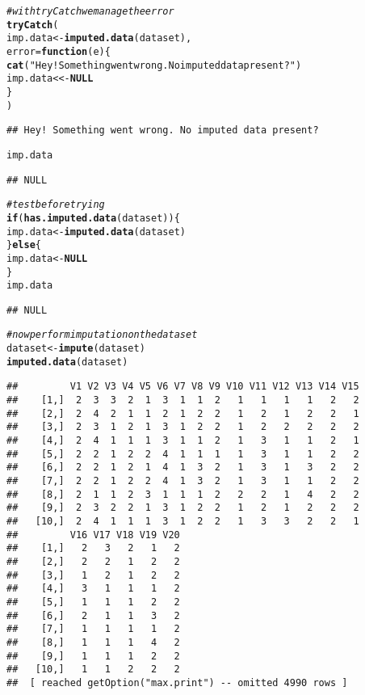 \documentclass{article}\usepackage[]{graphicx}\usepackage[]{color}
\makeatletter
\newcommand{\hlstr}[1]{\textcolor[rgb]{0.192,0.494,0.8}{#1}}%
\newcommand{\hlcom}[1]{\textcolor[rgb]{0.678,0.584,0.686}{\textit{#1}}}%
\newcommand{\hlstd}[1]{\textcolor[rgb]{0.345,0.345,0.345}{#1}}%
\newcommand{\hlkwa}[1]{\textcolor[rgb]{0.161,0.373,0.58}{\textbf{#1}}}%
\newcommand{\hlkwb}[1]{\textcolor[rgb]{0.69,0.353,0.396}{#1}}%
\newcommand{\hlkwc}[1]{\textcolor[rgb]{0.333,0.667,0.333}{#1}}%
\newcommand{\hlkwd}[1]{\textcolor[rgb]{0.737,0.353,0.396}{\textbf{#1}}}%
\newenvironment{kframe}{%
 \def\at@end@of@kframe{}%
 \ifinner\ifhmode%
  \def\at@end@of@kframe{\end{minipage}}%
  \begin{minipage}{\columnwidth}%
 \fi\fi%
 \def\FrameCommand##1{\hskip\@totalleftmargin \hskip-\fboxsep
 \colorbox{shadecolor}{##1}\hskip-\fboxsep
     \hskip-\linewidth \hskip-\@totalleftmargin \hskip\columnwidth}%
 \MakeFramed {\advance\hsize-\width
   \@totalleftmargin\z@ \linewidth\hsize
   \@setminipage}}%
 {\par\unskip\endMakeFramed%
 \at@end@of@kframe}
\newenvironment{knitrout}{}{} %
\makeatother
\begin{document}
\begin{knitrout}
\begin{kframe}
{\ttfamily\noindent\bfseries\color{errorcolor}{\#\# Error in imputed.data(dataset): The dataset contains no imputed data. Please impute data before learning.\\\#\# See > ?impute for help.}}\begin{alltt}
\hlcom{# with tryCatch we manage the error}
\hlkwd{tryCatch}\hlstd{(}
  \hlstd{imp.data} \hlkwb{<-} \hlkwd{imputed.data}\hlstd{(dataset),}
  \hlkwc{error} \hlstd{=} \hlkwa{function}\hlstd{(}\hlkwc{e}\hlstd{) \{}
    \hlkwd{cat}\hlstd{(}\hlstr{"Hey! Something went wrong. No imputed data present?"}\hlstd{)}
    \hlstd{imp.data} \hlkwb{<<-} \hlkwa{NULL}
  \hlstd{\}}
\hlstd{)}
\end{alltt}
\begin{verbatim}
## Hey! Something went wrong. No imputed data present?
\end{verbatim}
\begin{alltt}
\hlstd{imp.data}
\end{alltt}
\begin{verbatim}
## NULL
\end{verbatim}
\begin{alltt}
\hlcom{# test before trying}
\hlkwa{if} \hlstd{(}\hlkwd{has.imputed.data}\hlstd{(dataset)) \{}
  \hlstd{imp.data} \hlkwb{<-} \hlkwd{imputed.data}\hlstd{(dataset)}
\hlstd{\}} \hlkwa{else} \hlstd{\{}
  \hlstd{imp.data} \hlkwb{<-} \hlkwa{NULL}
\hlstd{\}}
\hlstd{imp.data}
\end{alltt}
\begin{verbatim}
## NULL
\end{verbatim}
\begin{alltt}
\hlcom{# now perform imputation on the dataset}
\hlstd{dataset} \hlkwb{<-} \hlkwd{impute}\hlstd{(dataset)}
\hlkwd{imputed.data}\hlstd{(dataset)}
\end{alltt}
\begin{verbatim}
##         V1 V2 V3 V4 V5 V6 V7 V8 V9 V10 V11 V12 V13 V14 V15
##    [1,]  2  3  3  2  1  3  1  1  2   1   1   1   1   2   2
##    [2,]  2  4  2  1  1  2  1  2  2   1   2   1   2   2   1
##    [3,]  2  3  1  2  1  3  1  2  2   1   2   2   2   2   2
##    [4,]  2  4  1  1  1  3  1  1  2   1   3   1   1   2   1
##    [5,]  2  2  1  2  2  4  1  1  1   1   3   1   1   2   2
##    [6,]  2  2  1  2  1  4  1  3  2   1   3   1   3   2   2
##    [7,]  2  2  1  2  2  4  1  3  2   1   3   1   1   2   2
##    [8,]  2  1  1  2  3  1  1  1  2   2   2   1   4   2   2
##    [9,]  2  3  2  2  1  3  1  2  2   1   2   1   2   2   2
##   [10,]  2  4  1  1  1  3  1  2  2   1   3   3   2   2   1
##         V16 V17 V18 V19 V20
##    [1,]   2   3   2   1   2
##    [2,]   2   2   1   2   2
##    [3,]   1   2   1   2   2
##    [4,]   3   1   1   1   2
##    [5,]   1   1   1   2   2
##    [6,]   2   1   1   3   2
##    [7,]   1   1   1   1   2
##    [8,]   1   1   1   4   2
##    [9,]   1   1   1   2   2
##   [10,]   1   1   2   2   2
##  [ reached getOption("max.print") -- omitted 4990 rows ]
\end{verbatim}
\end{kframe}
\end{knitrout}
\end{document}
